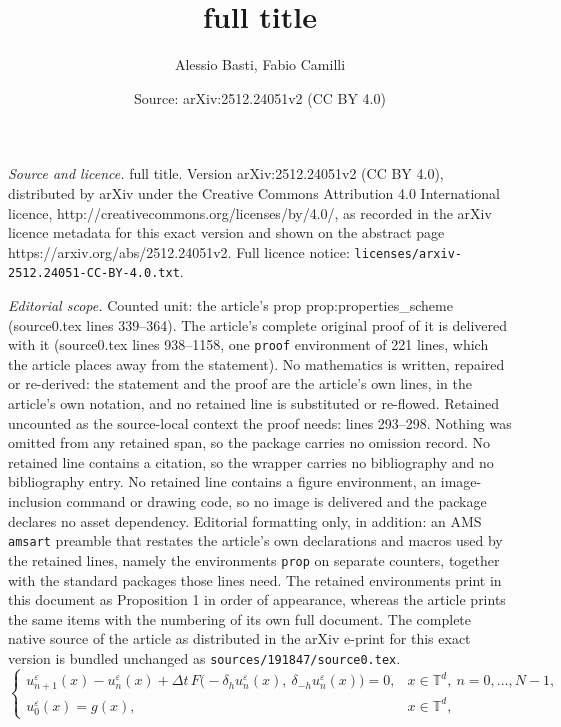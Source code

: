 \documentclass[10pt,a4paper]{amsart}
\title{full title}
\author{Alessio Basti, Fabio Camilli}
\date{Source: arXiv:2512.24051v2 (CC BY 4.0)}
\begin{document}
\maketitle

\noindent\emph{Source and licence.} full title. Version arXiv:2512.24051v2 (CC BY 4.0), distributed by arXiv under the Creative Commons Attribution 4.0 International licence, http://creativecommons.org/licenses/by/4.0/, as recorded in the arXiv licence metadata for this exact version and shown on the abstract page https://arxiv.org/abs/2512.24051v2. Full licence notice: \texttt{licenses/arxiv-2512.24051-CC-BY-4.0.txt}.\par\smallskip

\noindent\textit{Editorial scope.} Counted unit: the article's prop prop:properties\_scheme (source0.tex lines 339--364). The article's complete original proof of it is delivered with it (source0.tex lines 938--1158, one \texttt{proof} environment of 221 lines, which the article places away from the statement). No mathematics is written, repaired or re-derived: the statement and the proof are the article's own lines, in the article's own notation, and no retained line is substituted or re-flowed.  Retained uncounted as the source-local context the proof needs: lines 293--298.  Nothing was omitted from any retained span, so the package carries no omission record.  No retained line contains a citation, so the wrapper carries no bibliography and no bibliography entry.  No retained line contains a figure environment, an image-inclusion command or drawing code, so no image is delivered and the package declares no asset dependency.  Editorial formatting only, in addition: an AMS \texttt{amsart} preamble that restates the article's own declarations and macros used by the retained lines, namely the environments \texttt{prop} on separate counters, together with the standard packages those lines need.  The retained environments print in this document as Proposition 1 in order of appearance, whereas the article prints the same items with the numbering of its own full document.  The complete native source of the article as distributed in the arXiv e-print for this exact version is bundled unchanged as \texttt{sources/191847/source0.tex}.
\begin{equation}\label{HJ_app_d}
\begin{cases}
u^\varepsilon_{n+1}(x)-u^\varepsilon_n(x) + \Delta t\, F\big(-\delta_{h} u^\varepsilon_n(x),\ \delta_{-h} u^\varepsilon_n(x)\big)=0, & x\in\mathbb{T}^d,\ n=0,\dots,N-1,\\[4pt]
u^\varepsilon_0(x)=g(x), & x\in\mathbb{T}^d,
\end{cases}
\end{equation}
\end{document}
